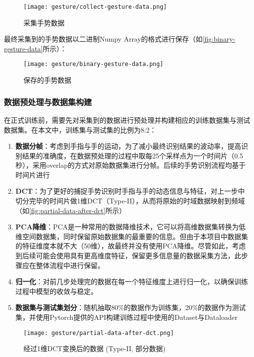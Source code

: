 \begin{figure}[H]
    \centering
    \texttt{[image: gesture/collect-gesture-data.png]}
    \caption{\label{fig:collect-gesture-data}采集手势数据}
\end{figure}

最终采集到的手势数据以二进制Numpy Array的格式进行保存（如\autoref{fig:binary-gesture-data}所示）：

\begin{figure}[H]
    \centering
    \texttt{[image: gesture/binary-gesture-data.png]}
    \caption{\label{fig:binary-gesture-data}保存的手势数据}
\end{figure}

\subsubsection{数据预处理与数据集构建}
在正式训练前，需要先对采集到的数据进行预处理并构建相应的训练数据集与测试数据集。在本文中，训练集与测试集的比例为8:2：
\begin{enumerate}[label=(\alph*)]
    \item {\bfseries 数据分帧}：考虑到手指与手的运动，为了减小最终识别结果的波动率，提高识别结果的准确度，在数据预处理的过程中取每25个采样点为一个时间片（0.5秒），采用overlap的方式对原始数据集进行分帧。后续的手势识别流程均基于时间片进行
    \item {\bfseries DCT}：为了更好的捕捉手势识别时手指与手的动态信息与特征，对上一步中切分完毕的时间片做1维DCT（Type-II），从而将原始的时域数据映射到频域（如\autoref{fig:partial-data-after-dct}所示）
    \item {\bfseries PCA降维}：PCA是一种常用的数据降维技术，它可以将高维数据集转换为低维空间数据集，同时保留原始数据集的最重要的信息。但由于本项目中数据集的特征维度本就不大（50维），故最终并没有使用PCA降维。尽管如此，考虑到后续可能会使用具有更高维度特征，保留更多信息量的数据采集方法，此步骤应在整体流程中进行保留。
    \item {\bfseries 归一化}：对前几步处理完的数据在每一个特征维度上进行归一化，以确保训练过程中模型的收敛与稳定。
    \item {\bfseries 数据集与测试集划分}：随机抽取80\%的数据作为训练集，20\%的数据作为测试集，并使用Pytorch提供的API构建训练过程中使用的Dataset与Dataloader
\end{enumerate}

\begin{figure}[H]
    \centering
    \texttt{[image: gesture/partial-data-after-dct.png]}
    \caption{\label{fig:partial-data-after-dct}经过1维DCT变换后的数据 (Type-II, 部分数据)}
\end{figure}

